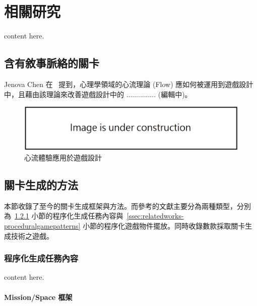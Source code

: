 \chapter{相關研究}
\label{cha:relatedworks}

content here.

\section{含有敘事脈絡的關卡}
\label{sec:flow-in-games}

Jenova Chen 在~\cite{chen2007flow} 提到，心理學領域的心流理論 (Flow) 應如何被運用到遊戲設計中，且藉由該理論來改善遊戲設計中的 ............... (編輯中)。

\begin{figure}[ht]
  \begin{center}
    \includegraphics[width=1.0\textwidth]{figures/under_construction.png}
    \caption{心流體驗應用於遊戲設計} 
    \label{fig:flow-in-games}
  \end{center}
\end{figure}

\section{關卡生成的方法}
\label{sec:relatedworks-levelgeneration}

本節收錄了至今的關卡生成框架與方法。而參考的文獻主要分為兩種類型，分別為~\ref{ssec:relatedworks-proceduralmission} 小節的程序化生成任務內容與~\ref{ssec:relatedworks-proceduralgamepatterns} 小節的程序化遊戲物件擺放。同時收錄數款採取關卡生成技術之遊戲。

\subsection{程序化生成任務內容}
\label{ssec:relatedworks-proceduralmission}

content here.

\subsubsection{Mission/Space 框架}
\label{sssec:relatedworks-proceduralmission-missionspace}


